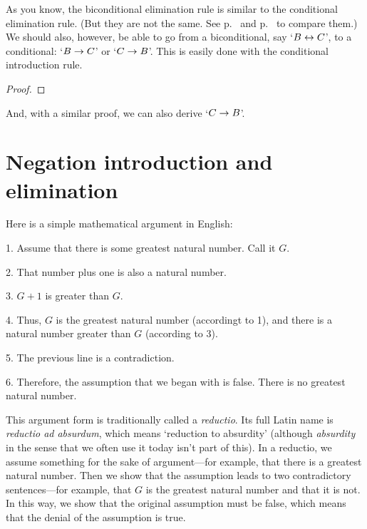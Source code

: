 \begin{earg}
\item As you know, the biconditional elimination rule is similar to the conditional elimination rule. (But they are not the same. See p.~\pageref{ce-rule} and p.~\pageref{be-rule} to compare them.) We should also, however, be able to go from a biconditional, say `$B \leftrightarrow C$', to a conditional: `$B \rightarrow C$' or `$C \rightarrow B$'. This is easily done with the conditional introduction rule.
\begin{proof}
	 \pr{}
	\open
		\as{}
	\close
\end{proof}
\smallskip
\noindent And, with a similar proof, we can also derive `$C \rightarrow B$'.


\end{earg}


\section{Negation introduction and elimination}
Here is a simple mathematical argument in English:
\begin{earg}
\item[1.] Assume that there is some greatest natural number. Call it $G$.
\item[2.] That number plus one is also a natural number.
\item[3.] $G+1$ is greater than $G$.
\item[4.] Thus, $G$ is the greatest natural number (accordingt to 1), and there is a natural number greater than $G$ (according to 3).
\item[5.] The previous line is a contradiction.
\item[6.] Therefore, the assumption that we began with is false. There is no greatest natural number.
\end{earg}
This argument form is traditionally called a \emph{reductio}. Its full Latin name is \emph{reductio ad absurdum}, which means `reduction to absurdity' (although \textit{absurdity} in the sense that we often use it today isn't part of this). In a reductio, we assume something for the sake of argument---for example, that there is a greatest natural number. Then we show that the assumption leads to two contradictory sentences---for example, that $G$ is the greatest natural number and that it is not. In this way, we show that the original assumption must be false, which means that the denial of the assumption is true. 

